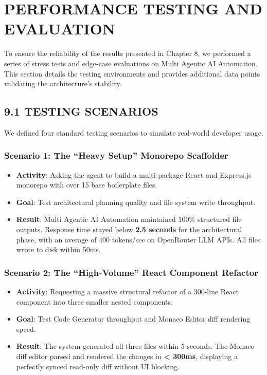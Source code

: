 \documentclass[
  12pt,
]{article}
\providecommand{\tightlist}{%
  \setlength{\itemsep}{0pt}\setlength{\parskip}{0pt}}
\begin{document}
\newpage

\section{PERFORMANCE TESTING AND
EVALUATION}\label{performance-testing-and-evaluation}

To ensure the reliability of the results presented in Chapter 8, we
performed a series of stress tests and edge-case evaluations on Multi
Agentic AI Automation. This section details the testing environments and
provides additional data points validating the architecture's stability.

\subsection{9.1 TESTING SCENARIOS}\label{testing-scenarios}

We defined four standard testing scenarios to simulate real-world
developer usage.

\subsubsection{Scenario 1: The ``Heavy Setup'' Monorepo
Scaffolder}\label{scenario-1-the-heavy-setup-monorepo-scaffolder}

\begin{itemize}
\tightlist
\item
  \textbf{Activity}: Asking the agent to build a multi-package React and
  Express.js monorepo with over 15 base boilerplate files.
\item
  \textbf{Goal}: Test architectural planning quality and file system
  write throughput.
\item
  \textbf{Result}: Multi Agentic AI Automation maintained 100\%
  structured file outputs. Response time stayed below \textbf{2.5
  seconds} for the architectural phase, with an average of 400
  tokens/sec on OpenRouter LLM APIs. All files wrote to disk within
  50ms.
\end{itemize}

\subsubsection{Scenario 2: The ``High-Volume'' React Component
Refactor}\label{scenario-2-the-high-volume-react-component-refactor}

\begin{itemize}
\tightlist
\item
  \textbf{Activity}: Requesting a massive structural refactor of a
  300-line React component into three smaller nested components.
\item
  \textbf{Goal}: Test Code Generator throughput and Monaco Editor diff
  rendering speed.
\item
  \textbf{Result}: The system generated all three files within 5
  seconds. The Monaco diff editor parsed and rendered the changes in
  \textbf{\textless{} 300ms}, displaying a perfectly synced read-only
  diff without UI blocking.
\end{itemize}
\end{document}
